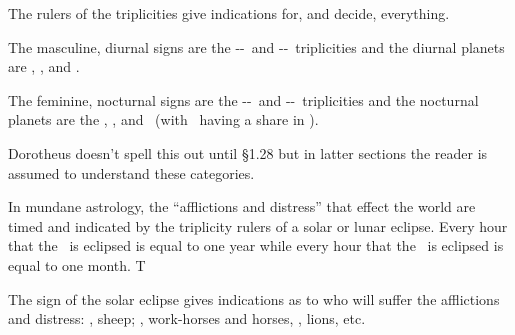 The rulers of the triplicities give indications for, and decide, everything.

\begin{mdframed}[backgroundcolor=cyan!5, rightmargin=1em, leftmargin=1em]
\footnotesize
The masculine, diurnal signs are the \Aries-\Leo-\Sagittarius\, and \Gemini-\Libra-\Aquarius\, triplicities and the diurnal planets are \Sun, \Jupiter, and \Saturn.

The feminine, nocturnal signs are the \Taurus-\Virgo-\Capricorn\, and \Cancer-\Scorpio-\Pisces\, triplicities and the nocturnal planets are the \Moon, \Venus, and \Mars\, (with \Mercury\, having a share in \Virgo).

Dorotheus doesn't spell this out until \S{1.28} but in latter sections the reader is assumed to understand these categories.
\end{mdframed}

In mundane astrology, the ``afflictions and distress'' that effect the world are timed and indicated by the triplicity rulers of a solar or lunar eclipse. Every hour that the \Sun\, is eclipsed is equal to one year while every hour that the \Moon\, is eclipsed is equal to one month. T

The sign of the solar eclipse gives indications as to who will suffer the afflictions and distress: \Aries, sheep; \Sagittarius, work-horses and horses, \Leo, lions, etc.
